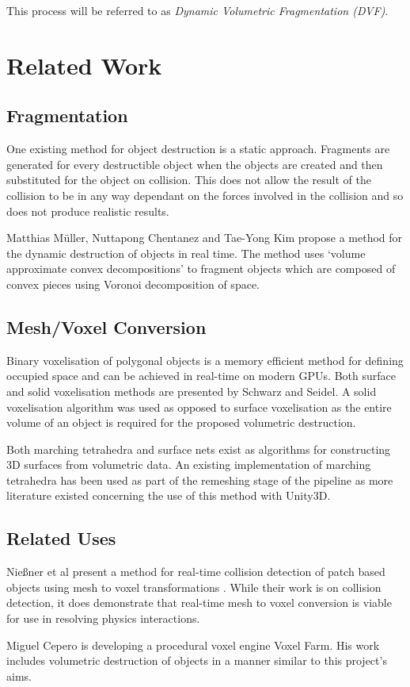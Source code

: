 This process will be referred to as {\emph{Dynamic Volumetric Fragmentation (DVF)}}.

\section{Related Work}

\subsection{Fragmentation}

\label{sect:relfrag}

One existing method for object destruction is a static approach. Fragments are generated for every destructible object when the objects are created and then substituted for the object on collision. This does not allow the result of the collision to be in any way dependant on the forces involved in the collision and so does not produce realistic results.

Matthias M\"{u}ller, Nuttapong Chentanez and Tae-Yong Kim propose a method for the dynamic destruction of objects in real time. The method uses `volume approximate convex decompositions' to fragment objects which are composed of convex pieces using Voronoi decomposition of space\cite{Muller:2013:RTD:2461912.2461934}.

\subsection{Mesh/Voxel Conversion}

Binary voxelisation of polygonal objects is a memory efficient method for defining occupied space and can be achieved in real-time on modern GPUs. Both surface and solid voxelisation methods are presented by Schwarz and Seidel\cite{Schwarz:2010:Vox}. A solid voxelisation algorithm was used as opposed to surface voxelisation as the entire volume of an object is required for the proposed volumetric destruction.

Both marching tetrahedra and surface nets exist as algorithms for constructing 3D surfaces from volumetric data\cite{Tetrahedra}\cite{Gibson:1998:CES:646921.709482}. An existing implementation of marching tetrahedra has been used as part of the remeshing stage of the pipeline as more literature existed concerning the use of this method with Unity3D\cite{Tetrahedra-CPU}.

\subsection{Related Uses}

Nie\ss{}ner et al present a method for real-time collision detection of patch based objects using mesh to voxel transformations \cite{niessner2013collision}. While their work is on collision detection, it does demonstrate that real-time mesh to voxel conversion is viable for use in resolving physics interactions.

Miguel Cepero is developing a procedural voxel engine Voxel Farm\cite{Procedural-World}. His work includes volumetric destruction of objects in a manner similar to this project's aims\cite{Appetite}.